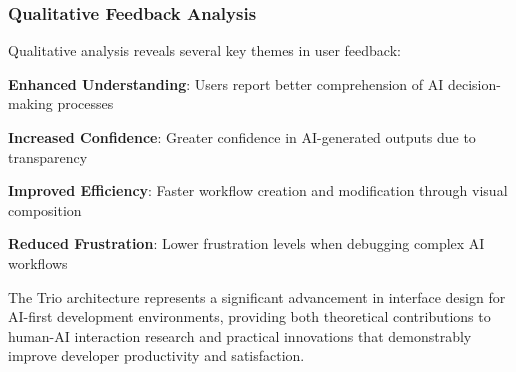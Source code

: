 \subsubsection*{Qualitative Feedback Analysis}

Qualitative analysis reveals several key themes in user feedback:

\begin{expandedlist}
    \item \textbf{Enhanced Understanding}: Users report better comprehension of AI decision-making processes
    \item \textbf{Increased Confidence}: Greater confidence in AI-generated outputs due to transparency
    \item \textbf{Improved Efficiency}: Faster workflow creation and modification through visual composition
    \item \textbf{Reduced Frustration}: Lower frustration levels when debugging complex AI workflows
\end{expandedlist}

The Trio architecture represents a significant advancement in interface design for AI-first development environments, providing both theoretical contributions to human-AI interaction research and practical innovations that demonstrably improve developer productivity and satisfaction.

